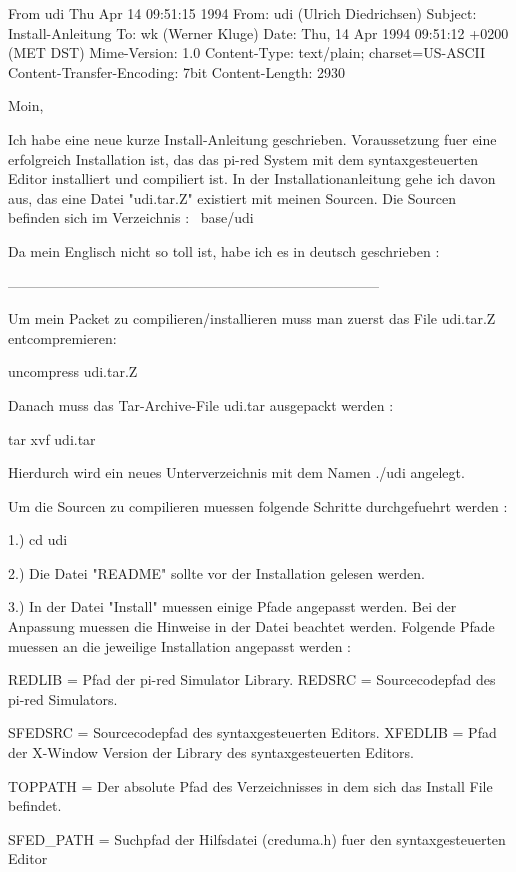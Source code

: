 From udi Thu Apr 14 09:51:15 1994
From: udi (Ulrich Diedrichsen)
Subject: Install-Anleitung
To: wk (Werner Kluge)
Date: Thu, 14 Apr 1994 09:51:12 +0200 (MET DST)
Mime-Version: 1.0
Content-Type: text/plain; charset=US-ASCII
Content-Transfer-Encoding: 7bit
Content-Length: 2930

Moin,

Ich habe eine neue kurze Install-Anleitung geschrieben.
Voraussetzung fuer eine erfolgreich Installation ist, das das pi-red
System mit dem syntaxgesteuerten Editor installiert und compiliert ist.
In der Installationanleitung gehe ich davon aus, das eine Datei
"udi.tar.Z" existiert mit meinen Sourcen. Die Sourcen befinden sich
im Verzeichnis :  ~base/udi

Da mein Englisch nicht so toll ist, habe ich es in deutsch geschrieben :

--------------------------------------------------------------------------------

Um mein Packet zu compilieren/installieren muss man zuerst das File
udi.tar.Z entcompremieren:

  uncompress udi.tar.Z

Danach muss das Tar-Archive-File udi.tar ausgepackt werden :

  tar xvf udi.tar

Hierdurch wird ein neues Unterverzeichnis mit dem Namen ./udi angelegt.

Um die Sourcen zu compilieren muessen folgende Schritte durchgefuehrt werden :

1.)  cd udi

2.)  Die Datei "README" sollte vor der Installation gelesen werden.

3.)  In der Datei "Install" muessen einige Pfade angepasst werden. Bei
     der Anpassung muessen die Hinweise in der Datei beachtet werden.
     Folgende Pfade muessen an die jeweilige Installation angepasst werden :

     REDLIB    = Pfad der pi-red Simulator Library.
     REDSRC    = Sourcecodepfad des pi-red Simulators.
     
     SFEDSRC   = Sourcecodepfad des syntaxgesteuerten Editors.
     XFEDLIB   = Pfad der X-Window Version der Library des 
                 syntaxgesteuerten Editors.

     TOPPATH   = Der absolute Pfad des Verzeichnisses in dem sich das Install
                 File befindet.

     SFED_PATH = Suchpfad der Hilfsdatei (creduma.h) fuer den syntaxgesteuerten
                 Editor

